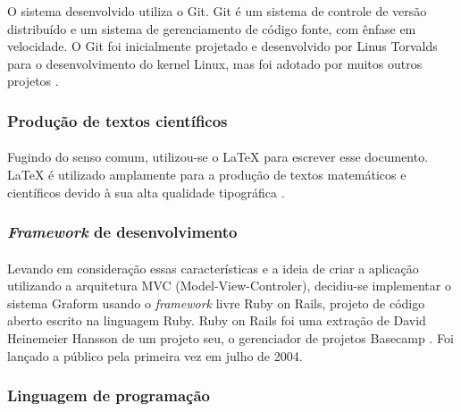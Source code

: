 \documentclass[11pt]{article}
\begin{document}
          O sistema desenvolvido utiliza o Git. Git é um sistema de 
          controle de versão distribuído e um sistema de gerenciamento 
          de código fonte, com ênfase em velocidade. O Git foi inicialmente 
          projetado e desenvolvido por Linus Torvalds para o desenvolvimento 
          do kernel Linux, mas foi adotado por muitos outros projetos \cite{website:git}.
          
        \subsubsection{Produção de textos científicos}

          \paragraph{}
          
          Fugindo do senso comum, utilizou-se o {\LaTeX} para escrever esse 
          documento. {\LaTeX} é utilizado amplamente 
          para a produção de textos matemáticos e científicos devido à 
          sua alta qualidade tipográfica \cite{website:latex}.
          
        \subsubsection{{\em Framework} de desenvolvimento}

          \paragraph{}
          
          Levando em consideração essas características e a ideia de 
          criar a aplicação utilizando a arquitetura MVC (Model-View-Controler), 
          decidiu-se implementar o sistema Graform usando o {\em framework }
          livre Ruby on Rails, projeto  de código 
          aberto escrito na linguagem Ruby. Ruby on Rails foi uma 
          extração de David Heinemeier Hansson de um projeto seu, o 
          gerenciador de projetos Basecamp \cite{website:rails,urubatan,thomas}. 
          Foi lançado a público pela primeira vez em julho de 2004.
          
        \subsubsection{Linguagem de programação}
\end{document}
